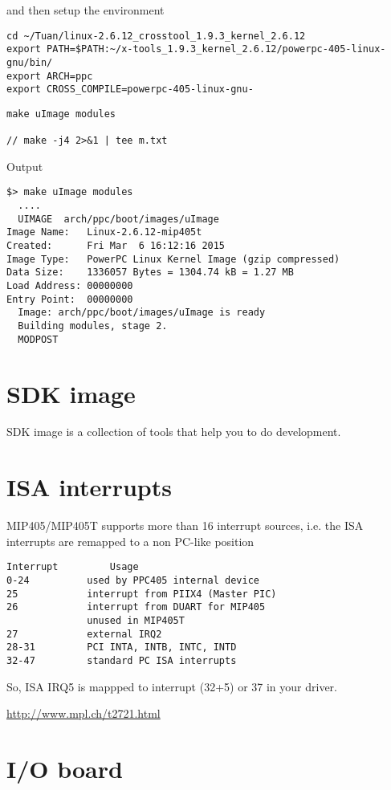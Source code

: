 and then setup the environment
\begin{verbatim}
cd ~/Tuan/linux-2.6.12_crosstool_1.9.3_kernel_2.6.12
export PATH=$PATH:~/x-tools_1.9.3_kernel_2.6.12/powerpc-405-linux-gnu/bin/
export ARCH=ppc
export CROSS_COMPILE=powerpc-405-linux-gnu-
\end{verbatim}


\begin{verbatim}
make uImage modules

// make -j4 2>&1 | tee m.txt
\end{verbatim}
Output
\begin{verbatim}
$> make uImage modules
  ....
  UIMAGE  arch/ppc/boot/images/uImage
Image Name:   Linux-2.6.12-mip405t
Created:      Fri Mar  6 16:12:16 2015
Image Type:   PowerPC Linux Kernel Image (gzip compressed)
Data Size:    1336057 Bytes = 1304.74 kB = 1.27 MB
Load Address: 00000000
Entry Point:  00000000
  Image: arch/ppc/boot/images/uImage is ready
  Building modules, stage 2.
  MODPOST
\end{verbatim}


\section{SDK image}

SDK image is a collection of tools that help you to do development.

\section{ISA interrupts}

MIP405/MIP405T supports more than 16 interrupt sources, i.e. the ISA interrupts are
remapped to a non PC-like position 
\begin{verbatim}
Interrupt         Usage
0-24          used by PPC405 internal device
25            interrupt from PIIX4 (Master PIC)
26            interrupt from DUART for MIP405
              unused in MIP405T
27            external IRQ2
28-31         PCI INTA, INTB, INTC, INTD
32-47         standard PC ISA interrupts
\end{verbatim}

So, ISA IRQ5 is mappped to interrupt (32+5) or 37 in your driver.

\url{http://www.mpl.ch/t2721.html}

\section{I/O board}

